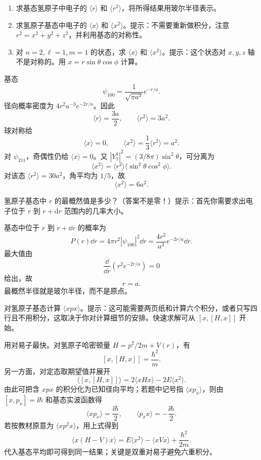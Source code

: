 \begin{question}
\begin{enumerate}
\item 求基态氢原子中电子的 $\langle r\rangle$ 和 $\langle r^2\rangle$，将所得结果用玻尔半径表示。
\item 求氢原子基态中电子的 $\langle x\rangle$ 和 $\langle x^2\rangle$。提示：不需要重新做积分，注意 $r^2=x^2+y^2+z^2$，并利用基态的对称性。
\item 对 $n=2,\ell=1,m=1$ 的状态，求 $\langle x\rangle$ 和 $\langle x^2\rangle$。提示：这个状态对 $x,y,z$ 轴不是对称的。用 $x=r\sin\theta\cos\phi$ 计算。
\end{enumerate}
\end{question}
\begin{solution}

基态
\[
\psi_{100}=\frac{1}{\sqrt{\pi a^3}}e^{-r/a}.
\]
径向概率密度为 $4r^2a^{-3}e^{-2r/a}$。因此
\[
\langle r\rangle=\frac{3a}{2},\qquad \langle r^2\rangle=3a^2.
\]
球对称给
\[
\langle x\rangle=0,
\qquad \langle x^2\rangle=\frac13\langle r^2\rangle=a^2.
\]
对 $\psi_{211}$，奇偶性仍给 $\langle x\rangle=0$。又 $|Y_1^1|^2=(3/8\pi)\sin^2\theta$，可分离为
\[
\langle x^2\rangle=\langle r^2\rangle\langle \sin^2\theta\cos^2\phi\rangle.
\]
对该态 $\langle r^2\rangle=30a^2$，角平均为 $1/5$，故
\[
\langle x^2\rangle=6a^2.
\]

\end{solution}

\begin{question}
氢原子基态中 $r$ 的最概然值是多少？（答案不是零！）提示：首先你需要求出电子位于 $r$ 到 $r+\mathrm dr$ 范围内的几率大小。
\end{question}
\begin{solution}

基态中位于 $r$ 到 $r+\dd r$ 的概率为
\[
P(r)\dd r=4\pi r^2|\psi_{100}|^2\dd r=\frac{4r^2}{a^3}e^{-2r/a}\dd r.
\]
最大值由
\[
\frac{\dd}{\dd r}\left(r^2e^{-2r/a}\right)=0
\]
给出，故
\[
r=a.
\]
最概然半径就是玻尔半径，而不是原点。

\end{solution}

\begin{question}
对氢原子基态计算 $\langle xpx\rangle$。提示：这可能需要两页纸和计算六个积分，或者只写四行且不用积分，这取决于你对计算细节的安排。快速求解可从 $[x,[H,x]]$ 开始。
\end{question}
\begin{solution}

用对易子最快。对氢原子哈密顿量 $H=p^2/2m+V(r)$，有
\[
[x,[H,x]]=\frac{\hbar^2}{m}.
\]
另一方面，对定态取期望值并展开
\[
\langle[x,[H,x]]\rangle=2\langle xHx\rangle-2E\langle x^2\rangle.
\]
由此可把含 $xpx$ 的积分化为已知径向平均；若题中记号指 $\langle xp_x\rangle$，则由 $[x,p_x]=\ii\hbar$ 和基态实波函数得
\[
\langle xp_x\rangle=\frac{\ii\hbar}{2},
\qquad
\langle p_xx\rangle=-\frac{\ii\hbar}{2}.
\]
若按教材原意为 $\langle x p^2 x\rangle$，用上式得到
\[
\langle x(H-V)x\rangle=E\langle x^2\rangle-\langle xVx\rangle+\frac{\hbar^2}{2m}.
\]
代入基态平均即可得到同一结果；关键是双重对易子避免六重积分。

\end{solution}

